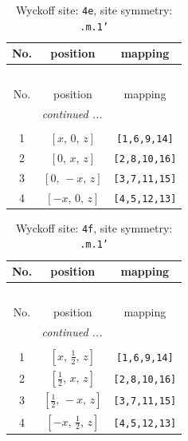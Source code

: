 \documentclass[fleqn,8pt]{jsarticle}
\begin{document}
\begin{longtable}{ccc}
\caption{Wyckoff site: {\tt 4e}, site symmetry: {\tt .m.1'}}
 \\
 \hline \hline
No. & position & mapping \\ \hline \endfirsthead

\multicolumn{2}{l}{\tablename\ \thetable{}} \\
 \hline \hline
No. & position & mapping \\ \hline \endhead

 \hline \hline
\multicolumn{2}{r}{\footnotesize\it continued ...} \\ \endfoot

 \hline \hline
\multicolumn{2}{r}{} \\ \endlastfoot

1 & $\left[ x,\, 0,\, z \right]$ & {\tt [1,6,9,14]} \\ \hline
2 & $\left[ 0,\, x,\, z \right]$ & {\tt [2,8,10,16]} \\ \hline
3 & $\left[ 0,\, - x,\, z \right]$ & {\tt [3,7,11,15]} \\ \hline
4 & $\left[ - x,\, 0,\, z \right]$ & {\tt [4,5,12,13]} \\
\end{longtable}
\renewcommand{\arraystretch}{1.2}
\begin{longtable}{ccc}
\caption{Wyckoff site: {\tt 4f}, site symmetry: {\tt .m.1'}}
 \\
 \hline \hline
No. & position & mapping \\ \hline \endfirsthead

\multicolumn{2}{l}{\tablename\ \thetable{}} \\
 \hline \hline
No. & position & mapping \\ \hline \endhead

 \hline \hline
\multicolumn{2}{r}{\footnotesize\it continued ...} \\ \endfoot

 \hline \hline
\multicolumn{2}{r}{} \\ \endlastfoot

1 & $\left[ x,\, \frac{1}{2},\, z \right]$ & {\tt [1,6,9,14]} \\ \hline
2 & $\left[ \frac{1}{2},\, x,\, z \right]$ & {\tt [2,8,10,16]} \\ \hline
3 & $\left[ \frac{1}{2},\, - x,\, z \right]$ & {\tt [3,7,11,15]} \\ \hline
4 & $\left[ - x,\, \frac{1}{2},\, z \right]$ & {\tt [4,5,12,13]} \\
\end{longtable}
\end{document}
